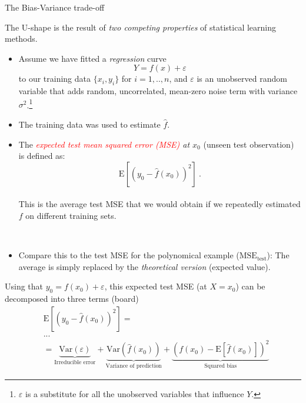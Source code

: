 \documentclass[
  ignorenonframetext,
]{beamer}
\providecommand{\tightlist}{%
  \setlength{\itemsep}{0pt}\setlength{\parskip}{0pt}}
\begin{document}
\begin{frame}{The Bias-Variance trade-off}
\protect\hypertarget{the-bias-variance-trade-off}{}
\vspace{2mm}

The U-shape is the result of \emph{two competing properties} of
statistical learning methods.

\vspace{2mm}

\begin{itemize}
\tightlist
\item
  Assume we have fitted a \emph{regression} curve
  \[Y  = f(x) + \varepsilon\] to our training data \(\{x_i, y_i\}\) for
  \(i=1,..,n\), and \(\varepsilon\) is an unobserved random variable
  that adds random, uncorrelated, mean-zero noise term with variance
  \(\sigma^2\).\footnote{$\varepsilon$ is a substitute for all the unobserved variables that influence $Y$.}
\end{itemize}

\vspace{2mm}

\begin{itemize}
\tightlist
\item
  The training data was used to estimate \(\hat{f}\).
\end{itemize}
\end{frame}

\begin{frame}
\begin{itemize}
\tightlist
\item
  The \emph{\textcolor{red}{expected test mean squared error (MSE)} at
  \(x_0\)} (unseen test observation) is defined as:
  \[\text{E}[(y_0 - \hat{f}(x_0))^2] \ .\]\\
  This is the average test MSE that we would obtain if we repeatedly
  estimated \(f\) on different training sets.
\end{itemize}

\(~\)

\begin{itemize}
\tightlist
\item
  Compare this to the test MSE for the polynomical example
  (\(\text{MSE}_{\text{test}}\)): The average is simply replaced by the
  \emph{theoretical version} (expected value).
\end{itemize}
\end{frame}

\begin{frame}
Using that \(y_0=f(x_0)+\varepsilon\), this expected test MSE (at
\(X=x_0\)) can be decomposed into three terms (board) \begin{align*}
&\text{E}[(y_0 - \hat{f}(x_0))^2] = \\
& ... \\
& =  \underbrace{\text{Var}(\varepsilon)}_{\text{Irreducible error}} + \underbrace{\text{Var}(\hat{f}(x_0))}_{\text{Variance of prediction}} + \underbrace{\left( f(x_0) - \text{E}[\hat{f}(x_0)] \right)^2}_{\text{Squared bias}}
\end{align*}
\end{frame}
\end{document}
